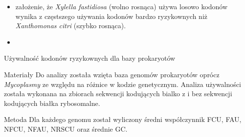 \documentclass[compress,clock,xcolor=dvipsnames,hyperref={pdfpagelabels=false},final]{beamer}
\begin{document}
\begin{frame}
\begin{itemize}
 \item założenie, że {\it Xylella fastidiosa} (wolno rosnąca) używa losowo kodonów wynika
z częstszego używania kodonów bardzo ryzykownych niż {\it Xanthomonas citri} (szybko rosnąca).
\pause \item 
\end{itemize}
\end{frame}

\begin{frame}{Używalność kodonów ryzykownych dla bazy prokaryotów}
\begin{block}{Materiały}
 Do analizy została wzięta baza genomów prokaryotów oprócz {\it Mycoplasmy}
 ze względu na różnice w kodzie genetycznym. Analiza używalności została 
wykonana na zbiorach sekwencji kodujących bialko z i bez sekwencji kodujących
 białka rybosomalne.
\end{block}
\pause
\begin{block}{Metoda}
Dla każdego genomu został wyliczony średni współczynnik FCU, FAU, NFCU, NFAU, NRSCU oraz średnie GC.
\end{block}
\end{frame}

\begin{frame}
\begin{center}
\\
\end{center}
\end{frame}
\end{document}
